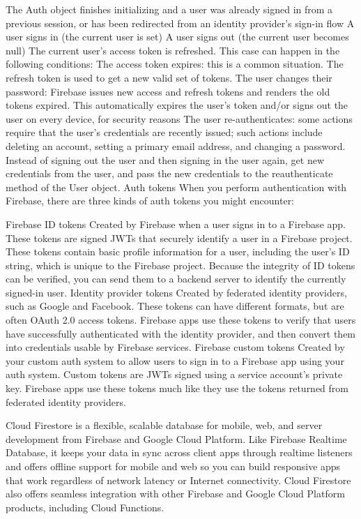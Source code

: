 The Auth object finishes initializing and a user was already signed in from a previous session, or has been redirected from an identity provider's sign-in flow
A user signs in (the current user is set)
A user signs out (the current user becomes null)
The current user's access token is refreshed. This case can happen in the following conditions:
The access token expires: this is a common situation. The refresh token is used to get a new valid set of tokens.
The user changes their password: Firebase issues new access and refresh tokens and renders the old tokens expired. This automatically expires the user's token and/or signs out the user on every device, for security reasons
The user re-authenticates: some actions require that the user's credentials are recently issued; such actions include deleting an account, setting a primary email address, and changing a password. Instead of signing out the user and then signing in the user again, get new credentials from the user, and pass the new credentials to the reauthenticate method of the User object.
Auth tokens
When you perform authentication with Firebase, there are three kinds of auth tokens you might encounter:

Firebase ID tokens	Created by Firebase when a user signs in to a Firebase app. These tokens are signed JWTs that securely identify a user in a Firebase project. These tokens contain basic profile information for a user, including the user's ID string, which is unique to the Firebase project. Because the integrity of ID tokens can be verified, you can send them to a backend server to identify the currently signed-in user.
Identity provider tokens	Created by federated identity providers, such as Google and Facebook. These tokens can have different formats, but are often OAuth 2.0 access tokens. Firebase apps use these tokens to verify that users have successfully authenticated with the identity provider, and then convert them into credentials usable by Firebase services.
Firebase custom tokens	Created by your custom auth system to allow users to sign in to a Firebase app using your auth system. Custom tokens are JWTs signed using a service account's private key. Firebase apps use these tokens much like they use the tokens returned from federated identity providers.



Cloud Firestore is a flexible, scalable database for mobile, web, and server development from Firebase and Google Cloud Platform. Like Firebase Realtime Database, it keeps your data in sync across client apps through realtime listeners and offers offline support for mobile and web so you can build responsive apps that work regardless of network latency or Internet connectivity. Cloud Firestore also offers seamless integration with other Firebase and Google Cloud Platform products, including Cloud Functions.

